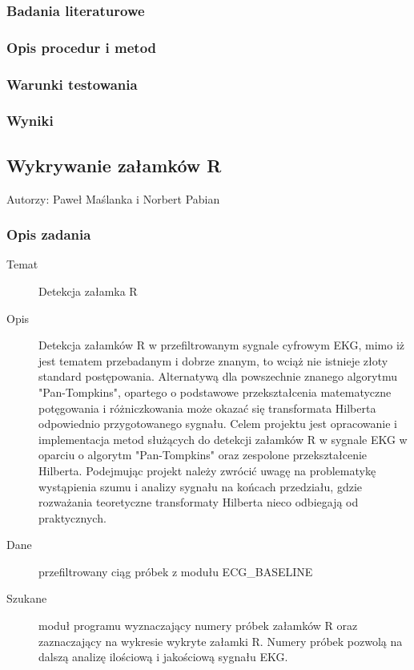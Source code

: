 \documentclass[a4paper, 11pt]{article}
\begin{document}
\subsubsection{Badania literaturowe}
\label{sec:baseline:papers}

\subsubsection{Opis procedur i metod}
\label{sec:baseline:procs}

\subsubsection{Warunki testowania}
\label{sec:baseline:tests}

\subsubsection{Wyniki}
\label{sec:baseline:results}

\subsection{Wykrywanie załamków R}
\label{sec:Rs}
Autorzy: Paweł Maślanka i Norbert Pabian

\subsubsection{Opis zadania}
\label{sec:rs:desc}
\begin{description}
\item[Temat] Detekcja załamka R
\item[Opis] Detekcja załamków R w przefiltrowanym sygnale cyfrowym EKG, mimo iż jest tematem przebadanym i dobrze znanym, to wciąż nie istnieje złoty standard postępowania. Alternatywą dla powszechnie znanego algorytmu "Pan-Tompkins", opartego o podstawowe przekształcenia matematyczne potęgowania i różniczkowania może okazać się transformata Hilberta odpowiednio przygotowanego sygnału. Celem projektu jest opracowanie i implementacja metod służących do detekcji załamków R w sygnale EKG w oparciu o algorytm "Pan-Tompkins" oraz zespolone przekształcenie Hilberta. Podejmując projekt należy zwrócić uwagę na problematykę wystąpienia szumu i analizy sygnału na końcach przedziału, gdzie rozważania teoretyczne transformaty Hilberta nieco odbiegają od praktycznych.
\item[Dane] przefiltrowany ciąg próbek z modułu ECG\_BASELINE
\item[Szukane] moduł programu wyznaczający numery próbek załamków R oraz zaznaczający na
wykresie wykryte załamki R. Numery próbek pozwolą na dalszą analizę ilościową
i jakościową sygnału EKG.
\end{description}
\end{document}
